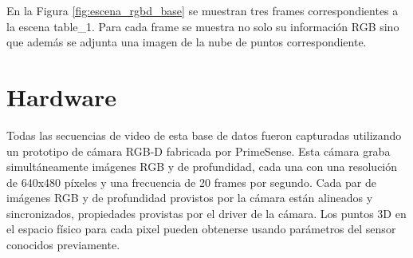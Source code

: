 En la Figura \ref{fig:escena_rgbd_base} se muestran tres frames correspondientes a la escena table\_1. Para cada frame se muestra no solo su información RGB sino que además se adjunta una imagen de la nube de puntos correspondiente.


\section{Hardware}
Todas las secuencias de video de esta base de datos fueron capturadas utilizando un prototipo de cámara RGB-D fabricada por PrimeSense. Esta cámara graba simultáneamente imágenes RGB y de profundidad, cada una con una resolución de 640x480 píxeles y una frecuencia de 20 frames por segundo. Cada par de imágenes RGB y de profundidad provistos por la cámara están alineados y sincronizados, propiedades provistas por el driver de la cámara. Los puntos 3D en el espacio físico para cada pixel pueden obtenerse usando parámetros del sensor conocidos previamente.
